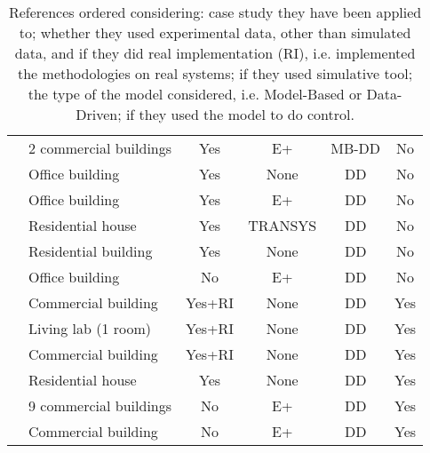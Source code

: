 \begin{table}[t!]
{\begin{tabular}{llcccc}
		\cite{Li2016AE}                  & 2 commercial buildings  & Yes                 & E+                  & MB-DD             & No                \\
		\cite{Safa2017SCS}               & Office building         & Yes                 & None                & DD                & No                \\
		\cite{Neto2008EB}                & Office building         & Yes                 & E+                  & DD                & No                \\
		\cite{Magnier2010BE}             & Residential house       & Yes                 & TRANSYS             & DD                & No                \\
		\cite{Candanedo2017EB}           & Residential building    & Yes                 & None                & DD                & No                \\
		\cite{Ascione2017E}              & Office building         & No                  & E+                  & DD                & No                \\
		\cite{Macarulla2017}             & Commercial building     & Yes+RI              & None                & DD                & Yes               \\
		\cite{Costanzo2016}              & Living lab (1 room)     & Yes+RI              & None                & DD                & Yes               \\
		\cite{Ferreira2012}              & Commercial building     & Yes+RI              & None                & DD                & Yes               \\
		\cite{Afram2017}                 & Residential house       & Yes                 & None                & DD                & Yes               \\
		\cite{Behl2016}                  & 9 commercial buildings  & No                  & E+                  & DD                & Yes               \\
		\cite{Jain2017TCPS}              & Commercial building     & No                  & E+                  & DD                & Yes               \\
		\bottomrule
	\end{tabular}\normalsize}
	\caption{\textcolor[rgb]{0,0,1}{References ordered considering: case study they have been applied to; whether they used experimental data, other than simulated data, and if they did real implementation (RI), i.e. implemented the methodologies on real systems; if they used simulative tool; the type of the model considered, i.e. Model-Based or Data-Driven; if they used the model to do control.}}
	\captionsetup{justification=centering}
	\label{T:RelatedWork}
\end{table}


